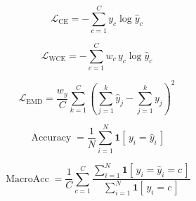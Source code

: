 \documentclass[11pt]{article}
\begin{document}
\begin{equation}
\mathcal{L}_{\text{CE}} = -\sum_{c=1}^{C} y_c \log \widehat{y}_c
\end{equation}

\begin{equation}
\mathcal{L}_{\text{WCE}} = -\sum_{c=1}^{C} w_c\, y_c \log \widehat{y}_c
\end{equation}

\begin{equation}
\mathcal{L}_{\text{EMD}} = \frac{w_y}{C}\sum_{k=1}^{C}\left(\sum_{j=1}^{k}\widehat{y}_j-\sum_{j=1}^{k}y_j\right)^2
\label{eq:emd}
\end{equation}

\begin{equation}
    \operatorname{Accuracy}=\frac{1}{N}\sum_{i=1}^{N}\mathbf{1}\!\left[\,y_i=\widehat{y}_i\,\right]
\end{equation}

\begin{equation}
\operatorname{MacroAcc} = \frac{1}{C}\sum_{c=1}^{C}\frac{\sum_{i=1}^{N}\mathbf{1}\!\left[\,y_i=\widehat{y}_i=c\,\right]}{\sum_{i=1}^{N}\mathbf{1}\!\left[\,y_i=c\,\right]}
\end{equation}
\end{document}
